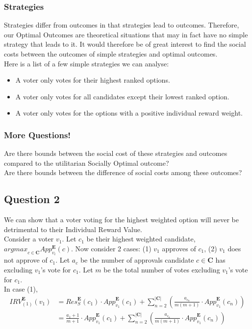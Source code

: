 \documentclass{article}
\begin{document}
\subsubsection{Strategies}

Strategies differ from outcomes in that strategies lead to outcomes. Therefore, our Optimal Outcomes are theoretical situations that may in fact have no simple strategy that leads to it. It would therefore be of great interest to find the social costs between the outcomes of simple strategies and optimal outcomes.\\

\noindent Here is a list of a few simple strategies we can analyse:
\begin{itemize}
  \item A voter only votes for their highest ranked options.
  \item A voter only votes for all candidates except their lowest ranked option.
  \item A voter only votes for the options with a positive individual reward weight.
\end{itemize}

\subsubsection{More Questions!}

Are there bounds between the social cost of these strategies and outcomes compared to the utilitarian Socially Optimal outcome?\\
Are there bounds between the difference of social costs among these outcomes?

\subsection{Question 2}
We can show that a voter voting for the highest weighted option will never be detrimental to their Individual Reward Value.\\

Consider a voter $v_{1}$. Let $c_{1}$ be their highest weighted candidate, ${argmax}_{c \in \pmb{C}}App^{\pmb{E}}_{v_{i}}(c)$. Now consider 2 cases: (1) $v_{1}$ approves of $c_{1}$, (2) $v_{1}$ does not approve of $c_{1}$. Let $a_{c}$ be the number of approvals candidate $c \in \pmb{C}$ has excluding $v_{1}$'s vote for $c_{1}$. Let $m$ be the total number of votes excluding $v_{1}$'s vote for $c_{1}$.\\

In case (1), 
\begin{equation}
\begin{aligned}
{IRV}^{\pmb{E}}_{(1)}(v_1) 
&= {Res}^{\pmb{E}}_{S}(c_1)\cdot{App}^{\pmb{E}}_{v_1}(c_1) + \sum^{|\pmb{C}|}_{n = 2}{\left(\frac{a_{c_n}}{m(m+1)}\cdot{App}^{\pmb{E}}_{v_1}(c_{n})\right)}\\
&= \frac{a_1+1}{m+1}\cdot{App}^{\pmb{E}}_{v_1}(c_1) + \sum^{|\pmb{C}|}_{n = 2}{\left(\frac{a_{c_n}}{m(m+1)}\cdot{App}^{\pmb{E}}_{v_1}(c_{n})\right)}
\end{aligned}  
\end{equation}
\end{document}
